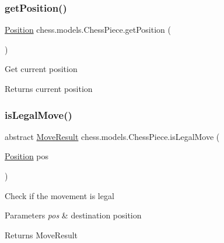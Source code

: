 \subsubsection{\texorpdfstring{get\+Position()}{getPosition()}}
{\footnotesize\ttfamily \mbox{\hyperlink{classchess_1_1models_1_1_position}{Position}} chess.\+models.\+Chess\+Piece.\+get\+Position (\begin{DoxyParamCaption}{ }\end{DoxyParamCaption})}

Get current position

\begin{DoxyReturn}{Returns}
current position 
\end{DoxyReturn}
\mbox{\label{classchess_1_1models_1_1_chess_piece_a60088166dd440bf51de4514c3e57841e}} 
\subsubsection{\texorpdfstring{is\+Legal\+Move()}{isLegalMove()}}
{\footnotesize\ttfamily abstract \mbox{\hyperlink{enumchess_1_1models_1_1enums_1_1_move_result}{Move\+Result}} chess.\+models.\+Chess\+Piece.\+is\+Legal\+Move (\begin{DoxyParamCaption}\item[{\mbox{\hyperlink{classchess_1_1models_1_1_position}{Position}}}]{pos }\end{DoxyParamCaption})\hspace{0.3cm}{\ttfamily [abstract]}}

Check if the movement is legal


\begin{DoxyParams}{Parameters}
{\em pos} & destination position \\
\hline
\end{DoxyParams}
\begin{DoxyReturn}{Returns}
Move\+Result 
\end{DoxyReturn}
\mbox{\label{classchess_1_1models_1_1_chess_piece_a77865fbd52257338c4e376af525155c7}} 
